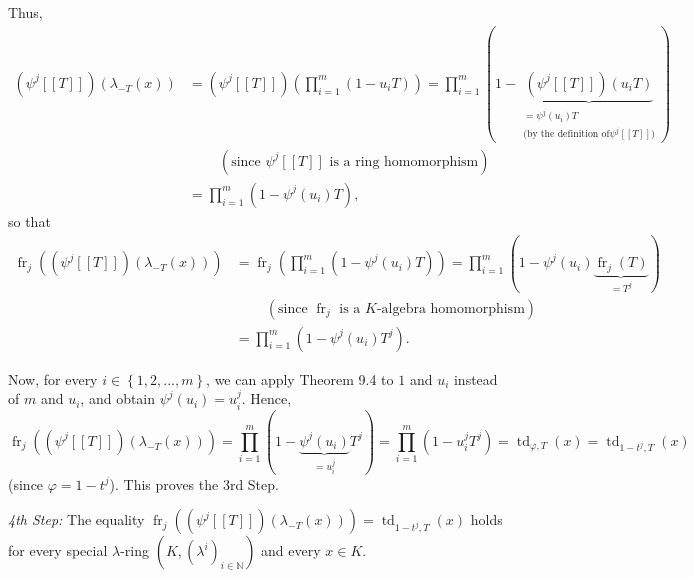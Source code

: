 \documentclass[numbers=enddot,12pt,final,onecolumn,notitlepage]{scrartcl}%
\begin{document}
Thus,%
\begin{align*}
\left(  \psi^{j}\left[  \left[  T\right]  \right]  \right)  \left(
\lambda_{-T}\left(  x\right)  \right)   &  =\left(  \psi^{j}\left[  \left[
T\right]  \right]  \right)  \left(  \prod\limits_{i=1}^{m}\left(
1-u_{i}T\right)  \right)  =\prod\limits_{i=1}^{m}\left(  1-\underbrace{\left(
\psi^{j}\left[  \left[  T\right]  \right]  \right)  \left(  u_{i}T\right)
}_{\substack{=\psi^{j}\left(  u_{i}\right)  T\\\text{(by the definition of
}\psi^{j}\left[  \left[  T\right]  \right]  \text{)}}}\right) \\
&  \ \ \ \ \ \ \ \ \ \ \left(  \text{since }\psi^{j}\left[  \left[  T\right]
\right]  \text{ is a ring homomorphism}\right) \\
&  =\prod\limits_{i=1}^{m}\left(  1-\psi^{j}\left(  u_{i}\right)  T\right)  ,
\end{align*}
so that%
\begin{align*}
\operatorname*{fr}\nolimits_{j}\left(  \left(  \psi^{j}\left[  \left[
T\right]  \right]  \right)  \left(  \lambda_{-T}\left(  x\right)  \right)
\right)   &  =\operatorname*{fr}\nolimits_{j}\left(  \prod\limits_{i=1}%
^{m}\left(  1-\psi^{j}\left(  u_{i}\right)  T\right)  \right)  =\prod
\limits_{i=1}^{m}\left(  1-\psi^{j}\left(  u_{i}\right)
\underbrace{\operatorname*{fr}\nolimits_{j}\left(  T\right)  }_{=T^{j}}\right)
\\
&  \ \ \ \ \ \ \ \ \ \ \left(  \text{since }\operatorname*{fr}\nolimits_{j}%
\text{ is a }K\text{-algebra homomorphism}\right) \\
&  =\prod\limits_{i=1}^{m}\left(  1-\psi^{j}\left(  u_{i}\right)
T^{j}\right)  .
\end{align*}


Now, for every $i\in\left\{  1,2,...,m\right\}  $, we can apply Theorem 9.4 to
$1$ and $u_{i}$ instead of $m$ and $u_{i}$, and obtain $\psi^{j}\left(
u_{i}\right)  =u_{i}^{j}$. Hence,%
\[
\operatorname*{fr}\nolimits_{j}\left(  \left(  \psi^{j}\left[  \left[
T\right]  \right]  \right)  \left(  \lambda_{-T}\left(  x\right)  \right)
\right)  =\prod\limits_{i=1}^{m}\left(  1-\underbrace{\psi^{j}\left(
u_{i}\right)  }_{=u_{i}^{j}}T^{j}\right)  =\prod\limits_{i=1}^{m}\left(
1-u_{i}^{j}T^{j}\right)  =\operatorname*{td}\nolimits_{\varphi,T}\left(
x\right)  =\operatorname*{td}\nolimits_{1-t^{j},T}\left(  x\right)
\]
(since $\varphi=1-t^{j}$). This proves the 3rd Step.

\textit{4th Step:} The equality $\operatorname*{fr}\nolimits_{j}\left(
\left(  \psi^{j}\left[  \left[  T\right]  \right]  \right)  \left(
\lambda_{-T}\left(  x\right)  \right)  \right)  =\operatorname*{td}%
\nolimits_{1-t^{j},T}\left(  x\right)  $ holds for every special $\lambda
$-ring $\left(  K,\left(  \lambda^{i}\right)  _{i\in\mathbb{N}}\right)  $ and
every $x\in K$.
\end{document}
